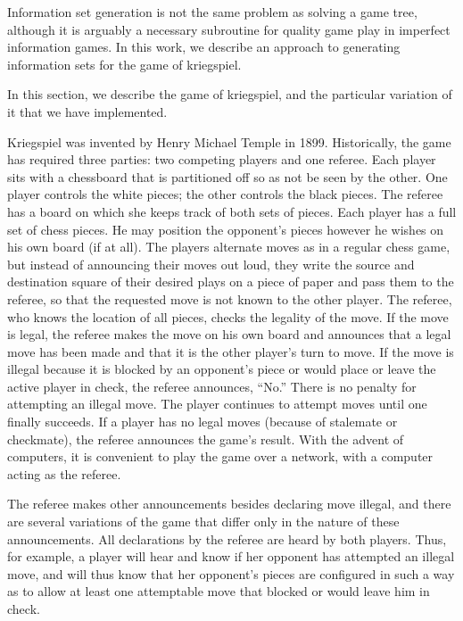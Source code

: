 \documentclass[times, 10pt,twocolumn]{article}
\begin{document}
Information set generation is not the same problem as solving a game tree, although it is arguably a necessary
subroutine for quality game play in imperfect information games.  In this work, we describe an approach to generating
information sets for the game of kriegspiel. 

In this section, we describe the game of kriegspiel, and the particular variation of it that we have implemented.

Kriegspiel was invented by Henry Michael Temple in 1899.  Historically, the game has required three parties: two
competing players and one referee.  Each player sits with a chessboard that is partitioned off so as not be seen by the
other.  One player controls the white pieces; the other controls the black pieces.  The referee has a board on which she
keeps track of both sets of pieces.  Each player has a full set of chess pieces.  He may position the opponent's pieces
however he wishes on his own board (if at all).  The players alternate moves as in a regular chess game, but instead of
announcing their moves out loud, they write the source and destination square of their desired plays on a piece of paper
and pass them to the referee, so that the requested move is not known to the other player. The referee, who knows the location of
all pieces, checks the legality of the move.  If the move is legal, the referee makes the move on his own board and
announces that a legal move has been made and that it is the other player's turn to move.  If the move is illegal
because it is blocked by an opponent's piece or would place or leave the active player in check, the referee announces,
``No.''  There is no penalty for attempting an illegal move.  The player continues to attempt moves until one finally
succeeds.  If a player has no legal moves (because of stalemate or checkmate), the referee announces the game's result.
With the advent of computers, it is convenient to play the game over a network, with a computer acting as the referee.

The referee makes other announcements besides declaring move illegal, and there are several variations of the game that
differ only in the nature of these announcements.  All declarations by the referee are heard by both players.  Thus, for
example, a player will hear and know if her opponent has attempted an illegal move, and will thus know that her
opponent's pieces are configured in such a way as to allow at least one attemptable move that blocked or would leave him
in check.  
\end{document}
